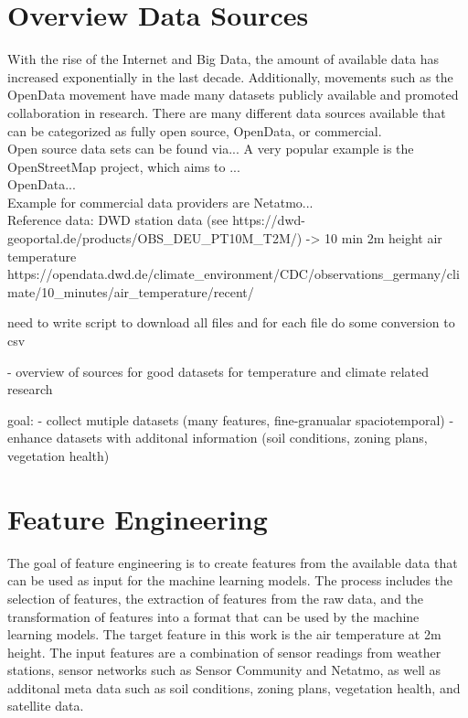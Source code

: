 \section{Overview Data Sources}

With the rise of the Internet and Big Data, the amount of available data has increased exponentially in the last decade. Additionally, movements such as the OpenData movement have made many datasets publicly available and promoted collaboration in research. There are many different data sources available that can be categorized as fully open source, OpenData, or commercial.\\
Open source data sets can be found via... A very popular example is the OpenStreetMap project, which aims to ...\\
OpenData...\\
Example for commercial data providers are Netatmo...\\

Reference data: DWD station data (see https://dwd-geoportal.de/products/OBS\_DEU\_PT10M\_T2M/) -> 10 min 2m height air temperature
https://opendata.dwd.de/climate\_environment/CDC/observations\_germany/climate/10\_minutes/air\_temperature/recent/

need to write script to download all files and for each file do some conversion to csv

- overview of sources for good datasets for temperature and climate related research

goal:
- collect mutiple datasets (many features, fine-granualar spaciotemporal)
- enhance datasets with additonal information (soil conditions, zoning plans, vegetation health)


\section{Feature Engineering}

The goal of feature engineering is to create features from the available data that can be used as input for the machine learning models. The process includes the selection of features, the extraction of features from the raw data, and the transformation of features into a format that can be used by the machine learning models.
The target feature in this work is the air temperature at 2m height. The input features are a combination of sensor readings from weather stations, sensor networks such as Sensor Community and Netatmo, as well as additonal meta data such as soil conditions, zoning plans, vegetation health, and satellite data.\\

